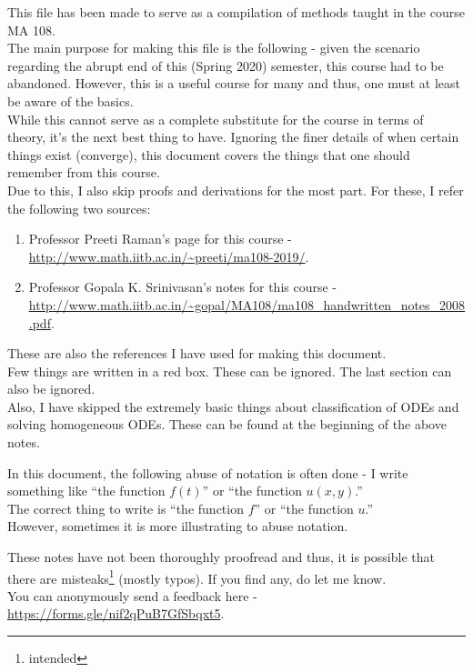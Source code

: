 This file has been made to serve as a compilation of methods taught in the course MA 108.\\
The main purpose for making this file is the following - given the scenario regarding the abrupt end of this (Spring 2020) semester, this course had to be abandoned. However, this is a useful course for many and thus, one must at least be aware of the basics.\\
While this cannot serve as a complete substitute for the course in terms of theory, it's the next best thing to have. Ignoring the finer details of when certain things exist (converge), this document covers the things that one should remember from this course.\\
Due to this, I also skip proofs and derivations for the most part. For these, I refer the following two sources:
\begin{enumerate}[leftmargin=*, nosep]
	\item Professor Preeti Raman's page for this course - \url{http://www.math.iitb.ac.in/~preeti/ma108-2019/}.
	\item Professor Gopala K. Srinivasan's notes for this course - \url{http://www.math.iitb.ac.in/~gopal/MA108/ma108_handwritten_notes_2008.pdf}.
\end{enumerate}

These are also the references I have used for making this document.\\
Few things are written in a red box. These can be ignored. The last section can also be ignored. \\
Also, I have skipped the extremely basic  things about classification of ODEs and solving homogeneous ODEs. These can be found at the beginning of the above notes.

\begin{mdframed}[style=boxstyle2, frametitle={A note on abuse of notation}]
	In this document, the following abuse of notation is often done - I write something like ``the function $f(t)$'' or ``the function $u(x, y)$.''\\
	The correct thing to write is ``the function $f$'' or ``the function $u$.''\\
	However, sometimes it is more illustrating to abuse notation.
\end{mdframed}

These notes have not been thoroughly proofread and thus, it is possible that there are misteaks\footnote{intended} (mostly typos). If you find any, do let me know.\\
You can anonymously send a feedback here - \\
\url{https://forms.gle/nif2qPuB7GfSbqxt5}.